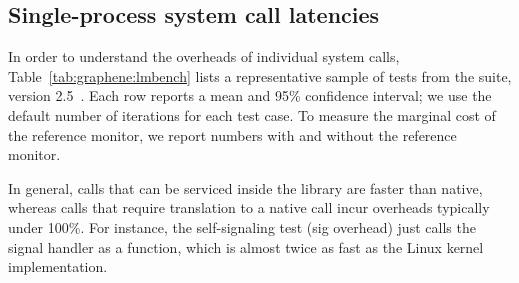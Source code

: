\subsection{Single-process system call latencies}
\label{eval:perf:syscall}


In order to understand the overheads of individual system calls,
Table~\ref{tab:graphene:lmbench} lists 
a representative sample of 
tests from the
\lmbench{} suite, version 2.5~\cite{McVoy:lmbench}.
Each row reports a mean and 95\% confidence interval;
we use the default number of iterations for each test case.
To measure the marginal cost of the reference monitor, we report numbers with and without 
the reference monitor.

In general, calls that can be serviced inside the library are faster than native,
whereas calls that require translation to a native call incur overheads typically under 100\%.
For instance, 
the self-signaling test (sig overhead)
just calls the signal handler as a function,
which is almost twice as fast
as the Linux kernel implementation.  


